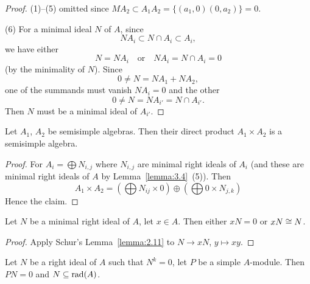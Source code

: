 \begin{proof}
(1)--(5) omitted since $MA_{2}\subset A_{1}A_{2}=\{(a_{1},0)(0,a_{2})\}=0$.

(6) For a minimal ideal $N$ of $A$, since
\begin{equation}
NA_{i}\subset N\cap A_{i}\subset A_{i},
\end{equation}
we have either
\begin{equation}
N=NA_{i}\quad\mbox{or}\quad NA_{i}=N\cap A_{i}=0
\end{equation}
(by the minimality of $N$). Since
\begin{equation}
0\neq N=NA_{1}+NA_{2},
\end{equation}
one of the summands must vanish $NA_{i}=0$ and the other
\begin{equation}
0\neq N=NA_{i'}=N\cap A_{i'}.
\end{equation}
Then $N$ must be a minimal ideal of $A_{i'}$.
\end{proof}

\begin{corollary}\label{cor:3.5}
Let $A_{1}$, $A_{2}$ be semisimple algebras. Then their direct product $A_{1}\times A_{2}$
is a semisimple algebra.
\end{corollary}

\begin{proof}
For $A_{i}=\bigoplus N_{i,j}$ where $N_{i,j}$ are minimal right ideals
of $A_{i}$ (and these are minimal right ideals of $A$ by
Lemma~\ref{lemma:3.4}~(5)). Then
\begin{equation}
A_{1}\times A_{2}=\left(\bigoplus N_{ij}\times
0\right)\oplus\left(\bigoplus0\times N_{j,k}\right)
\end{equation}
Hence the claim.
\end{proof}

\begin{lemma}\label{lemma:3.6}
Let $N$ be a minimal right ideal of $A$, let $x\in A$. Then either
$xN=0$ or $xN\cong N$.
\end{lemma}

\begin{proof}
Apply Schur's Lemma~\ref{lemma:2.11} to $N\to xN$, $y\mapsto xy$.
\end{proof}

\begin{lemma}\label{lemma:3.7}
Let $N$ be a right ideal of $A$ such that $N^{k}=0$, let $P$ be a
simple $A$-module. Then $PN=0$ and $N\subseteq\operatorname{rad}(A)$.
\end{lemma}

